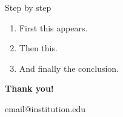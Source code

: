 \documentclass[aspectratio=169,11pt]{beamer}
\begin{document}
\begin{frame}{Step by step}
  \begin{enumerate}
    \item<1-> First this appears.
    \item<2-> Then this.
    \item<3-> \alert{And finally the conclusion.}
  \end{enumerate}
\end{frame}

\begin{frame}[plain]
  \centering\vfill
  {\Huge\bfseries Thank you!}\par\vspace{0.5cm}
  {\color{tocaGrey}email@institution.edu}
  \vfill
\end{frame}
\end{document}
